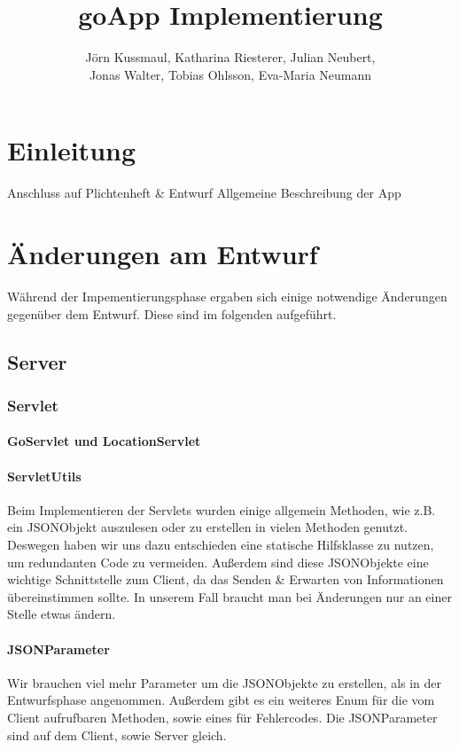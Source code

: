 \documentclass{scrartcl}
\title{goApp Implementierung}
\author{Jörn Kussmaul, Katharina Riesterer, Julian Neubert,\\ Jonas Walter, Tobias Ohlsson, Eva-Maria Neumann}
\begin{document}
	\maketitle
	\newpage
	\tableofcontents
	\newpage

	\section{Einleitung}
	Anschluss auf Plichtenheft \& Entwurf
	Allgemeine Beschreibung der App
	
	\newpage
	\section{Änderungen am Entwurf}
	Während der Impementierungsphase ergaben sich einige notwendige Änderungen gegenüber dem Entwurf. Diese sind im folgenden aufgeführt.
	
	\subsection{Server}
	\subsubsection{Servlet}
	\paragraph{GoServlet und LocationServlet}
	
	\paragraph{ServletUtils}
	Beim Implementieren der Servlets wurden einige allgemein Methoden, wie z.B. ein JSONObjekt auszulesen oder zu erstellen in vielen Methoden genutzt.
	Deswegen haben wir uns dazu entschieden eine statische Hilfsklasse zu nutzen, um redundanten Code zu vermeiden. Außerdem sind diese JSONObjekte eine wichtige Schnittstelle zum Client, da das Senden \& Erwarten von Informationen übereinstimmen sollte. In unserem Fall braucht man bei Änderungen nur an einer Stelle etwas ändern.
	
	\paragraph{JSONParameter}
	Wir brauchen viel mehr Parameter um die JSONObjekte zu erstellen, als in der Entwurfsphase angenommen. Außerdem gibt es ein weiteres Enum für die vom Client aufrufbaren Methoden, sowie eines für Fehlercodes. Die JSONParameter sind auf dem Client, sowie Server gleich. 
		
\end{document}

